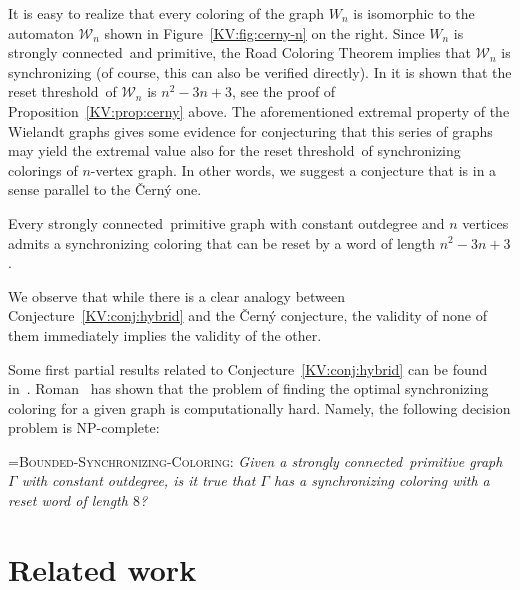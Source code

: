 \documentclass{irmaart}
\newcommand{\rt}{reset threshold}
\newcommand{\scn}{strongly connected}
\theoremstyle{plain}
\begin{document}
It is easy to realize that every coloring of the graph $W_n$ is isomorphic to
the automaton $\mathcal{W}_n$ shown in Figure~\ref{KV:fig:cerny-n} on the
right. Since $W_n$ is \scn\ and primitive, the Road Coloring Theorem implies
that $\mathcal{W}_n$ is synchronizing (of course, this can also be verified
directly). In \cite{Ananichev&Gusev&Volkov:2010} it is shown that the \rt\ of
$\mathcal{W}_n$ is $n^2-3n+3$, see the proof of Proposition~\ref{KV:prop:cerny}
above. The aforementioned extremal property of the Wielandt graphs gives some
evidence for conjecturing that this series of graphs may yield the extremal
value also for the \rt\ of synchronizing colorings of $n$-vertex graph. In
other words, we suggest a conjecture that is in a sense parallel to the
\v{C}ern\'{y} one.
\begin{conjecture}
\label{KV:conj:hybrid} Every \scn\ primitive graph with constant outdegree and
$n$ vertices admits a synchronizing coloring that can be reset by a word of
length $n^2-3n+3$.
\end{conjecture}
We observe that while there is a clear analogy between
Conjecture~\ref{KV:conj:hybrid} and the \v{C}ern\'{y} conjecture, the validity
of none of them immediately implies the validity of the other.

Some first partial results related to Conjecture~\ref{KV:conj:hybrid} can be
found in~\cite{Steinberg:2010archive,Carpi&D'Alessandro:2010}.
Roman~\cite{Roman:2011} has shown that the problem of finding the optimal
synchronizing coloring for a given graph is computationally hard. Namely, the
following decision problem
 is
\textsf{NP}-complete:

\smallskip

\hangindent=\parindent \noindent \textsc{Bounded-Synchronizing-Coloring:}
\emph{Given a \scn\ primitive graph $\Gamma$ with constant outdegree, is it
true that $\Gamma$ has a synchronizing coloring with a reset word of length
$8$?}

\section{Related work}
\label{KV:sec:related}


\begin{footnotesize}
  
\end{footnotesize}


\markright{\indexname}\markboth{\indexname}{\indexname}
\printindex
\end{document}
